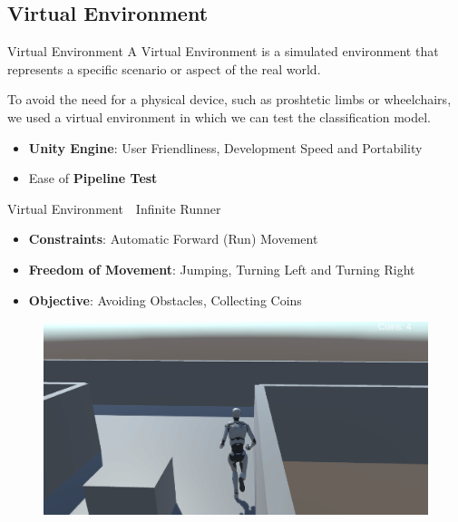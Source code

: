 \subsection*{Virtual Environment}
\begin{frame}{Virtual Environment}
    A Virtual Environment is a simulated environment that represents a specific scenario or aspect of the real world.

    \vspace*{.5cm}
    To avoid the need for a physical device, such as proshtetic limbs or wheelchairs, we used a virtual environment in which we can test the classification model.

    \vspace*{.5cm}
    \begin{itemize}
        \item \textbf{Unity Engine}: User Friendliness, Development Speed and Portability
        \item Ease of \textbf{Pipeline Test}
    \end{itemize}
\end{frame}
\begin{frame}{Virtual Environment~\textemdash{}~Infinite Runner}
    \begin{minipage}[c]{.49\textwidth}
        \begin{itemize}
            \item \textbf{Constraints}: Automatic Forward (Run) Movement
            \item \textbf{Freedom of Movement}: Jumping, Turning Left and Turning Right
            \item \textbf{Objective}: Avoiding Obstacles, Collecting Coins
        \end{itemize}
    \end{minipage}
    \begin{minipage}[c]{.49\textwidth}
        \begin{figure}
            \centering
            \includegraphics[width=\textwidth]{figures/Methodology/infinite_runner}
        \end{figure}
    \end{minipage}
\end{frame}
